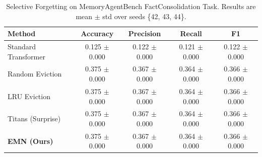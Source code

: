 \begin{table}[t]
\centering
\caption{Selective Forgetting on MemoryAgentBench FactConsolidation Task. Results are mean $\pm$ std over seeds \{42, 43, 44\}.}
\label{tab:selective_forgetting}
\begin{tabular}{lcccc}
\toprule
Method & Accuracy & Precision & Recall & F1 \\
\midrule
Standard Transformer & 0.125 $\pm$ 0.000 & 0.122 $\pm$ 0.000 & 0.121 $\pm$ 0.000 & 0.122 $\pm$ 0.000 \\
Random Eviction & 0.375 $\pm$ 0.000 & 0.367 $\pm$ 0.000 & 0.364 $\pm$ 0.000 & 0.366 $\pm$ 0.000 \\
LRU Eviction & 0.375 $\pm$ 0.000 & 0.367 $\pm$ 0.000 & 0.364 $\pm$ 0.000 & 0.366 $\pm$ 0.000 \\
Titans (Surprise) & 0.375 $\pm$ 0.000 & 0.367 $\pm$ 0.000 & 0.364 $\pm$ 0.000 & 0.366 $\pm$ 0.000 \\
\textbf{EMN (Ours)} & 0.375 $\pm$ 0.000 & 0.367 $\pm$ 0.000 & 0.364 $\pm$ 0.000 & 0.366 $\pm$ 0.000 \\
\bottomrule
\end{tabular}
\end{table}
